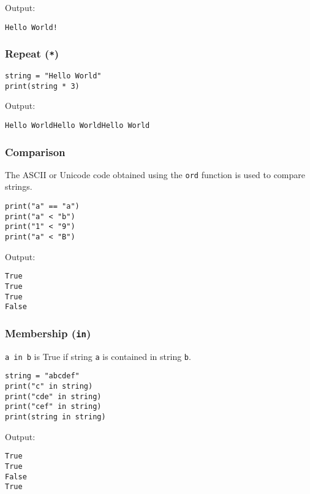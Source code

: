 \documentclass[11pt]{article}
\begin{document}
 \noindent Output:

\label{orgccbe128}
\begin{verbatim}
Hello World!
\end{verbatim}
\subsubsection{Repeat (\texttt{*})}
\label{sec:org4784541}
\begin{verbatim}
string = "Hello World"
print(string * 3)
\end{verbatim}

 \noindent Output:

\label{org128b74c}
\begin{verbatim}
Hello WorldHello WorldHello World
\end{verbatim}
\subsubsection{Comparison}
\label{sec:org1c80fca}
The ASCII or Unicode code obtained using the \texttt{ord} function is used to compare strings.
\begin{verbatim}
print("a" == "a")
print("a" < "b")
print("1" < "9")
print("a" < "B")
\end{verbatim}

 \noindent Output:

\label{orge841662}
\begin{verbatim}
True
True
True
False
\end{verbatim}
\subsubsection{Membership (\texttt{in})}
\label{sec:org121a8cd}
\texttt{a in b} is True if string \texttt{a} is contained in string \texttt{b}.
\begin{verbatim}
string = "abcdef"
print("c" in string)
print("cde" in string)
print("cef" in string)
print(string in string)
\end{verbatim}

 \noindent Output:

\label{org630b829}
\begin{verbatim}
True
True
False
True
\end{verbatim}
\end{document}
